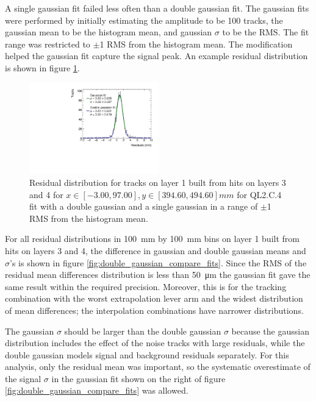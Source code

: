 A single gaussian fit failed less often than a double gaussian fit. The gaussian fits were performed by initially estimating the amplitude to be 100 tracks, the gaussian mean to be the histogram mean, and gaussian $\sigma$ to be the RMS. The fit range was restricted to $\pm$1 RMS from the histogram mean. The modification helped the gaussian fit capture the signal peak. An example residual distribution is shown in figure \ref{fig:double_gaussian_example_fit}. 


\begin{figure}
    \centering
    \includegraphics[width = 0.5\textwidth]{figures/figure_double_gaussian_quick_and_dirty_2900V_log_scale_gaussian_QL2C04_2900V_2021-02-08_2_xbin_10_ybin_5_100mm.pdf}
    \caption{Residual distribution for tracks on layer 1 built from hits on layers 3 and 4 for $x\in\left[-3.00, 97.00\right],  y\in\left[394.60, 494.60\right] mm$ for QL2.C.4 fit with a double gaussian and a single gaussian in a range of $\pm$1 RMS from the histogram mean.}
    \label{fig:double_gaussian_example_fit}
\end{figure}

For all residual distributions in \SI{100}{\milli\meter} by \SI{100}{\milli\meter} bins on layer 1 built from hits on layers 3 and 4, the difference in gaussian and double gaussian means and $\sigma$'s is shown in figure \ref{fig:double_gaussian_compare_fits}. Since the RMS of the residual mean differences distribution is less than \SI{50}{\micro\meter} the gaussian fit gave the same result within the required precision. Moreover, this is for the tracking combination with the worst extrapolation lever arm and the widest distribution of mean differences; the interpolation combinations have narrower distributions. 

The gaussian $\sigma$ should be larger than the double gaussian $\sigma$ because the gaussian distribution includes the effect of the noise tracks with large residuals, while the double gaussian models signal and background residuals separately. For this analysis, only the residual mean was important, so the systematic overestimate of the signal $\sigma$ in the gaussian fit shown on the right of figure \ref{fig:double_gaussian_compare_fits} was allowed.

